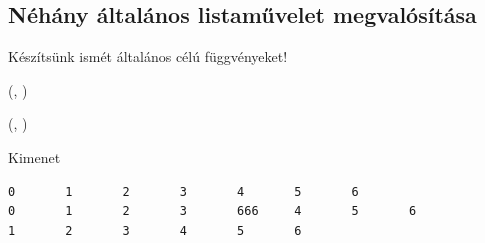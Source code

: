 \documentclass[usenames,dvipsnames,aspectratio=169]{beamer}
\begin{document}







\subsection{Néhány általános listaművelet megvalósítása}
\begin{frame}
  Készítsünk ismét általános célú függvényeket!
  \begin{exampleblock}{ %
(, )}
    \footnotesize
    \vspace{-.2cm}
    
    \vspace{-.2cm}
  \end{exampleblock}
\end{frame}





\begin{frame}[fragile]
  \begin{exampleblock}{ %
(, )}
    \small
    \vspace{-.2cm}
    
    \vspace{-.2cm}
  \end{exampleblock}
  \begin{block}{Kimenet}
    \small
    \vspace{-.2cm}
    \begin{verbatim}
0       1       2       3       4       5       6       
0       1       2       3       666     4       5       6       
1       2       3       4       5       6
\end{verbatim}
    \vspace{-.2cm}
  \end{block}
\end{frame}
\end{document}
